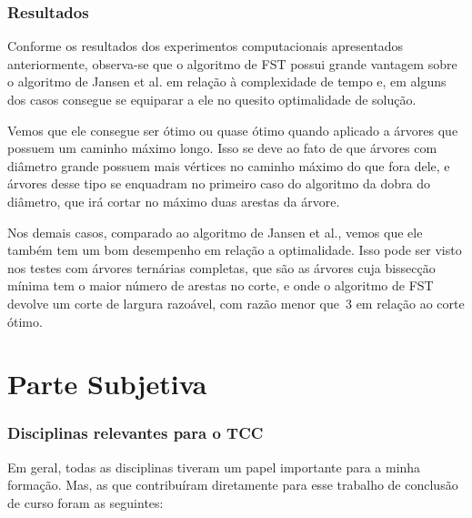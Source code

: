 \documentclass[a4paper,12pt]{article}
\begin{document}
\section {Resultados}
Conforme os resultados dos experimentos computacionais
 apresentados anteriormente, observa-se
que o algoritmo de FST possui grande vantagem sobre o algoritmo
de Jansen et al. em relação à complexidade de tempo e, em alguns 
dos casos consegue se equiparar a ele no quesito optimalidade de
solução.

Vemos que ele consegue ser ótimo ou quase ótimo quando aplicado
a árvores que possuem um caminho máximo longo. 
Isso se deve ao
fato de que árvores com diâmetro grande possuem 
mais vértices no caminho máximo do que fora dele, e
árvores desse tipo se enquadram no primeiro caso do algoritmo da 
dobra do diâmetro, que irá cortar no máximo duas arestas da árvore.

Nos demais casos, comparado ao algoritmo de Jansen et al.,
vemos que ele também tem um bom desempenho em relação a 
optimalidade. 
Isso pode ser visto nos testes com árvores ternárias 
completas,
que são as árvores cuja bissecção mínima
tem o maior número de arestas no corte, e onde o algoritmo
de FST devolve um corte de largura razoável, com razão
menor que~3 em relação ao corte ótimo.



\newpage



\newpage

\part{Parte Subjetiva}
\newpage


\section{Disciplinas relevantes para o TCC}
Em geral, todas as disciplinas tiveram um papel importante
para a minha formação. Mas, as que contribuíram
diretamente para esse trabalho de conclusão de curso
 foram as seguintes:
\end{document}
